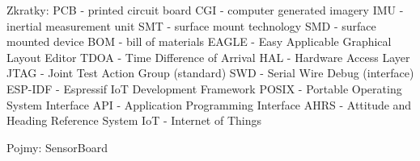 Zkratky:
PCB - printed circuit board
CGI - computer generated imagery
IMU - inertial measurement unit
SMT - surface mount technology
SMD - surface mounted device
BOM - bill of materials
EAGLE - Easy Applicable Graphical Layout Editor
TDOA - Time Difference of Arrival
HAL - Hardware Access Layer
JTAG - Joint Test Action Group (standard)
SWD - Serial Wire Debug (interface)
ESP-IDF - Espressif IoT Development Framework
POSIX - Portable Operating System Interface
API - Application Programming Interface
AHRS - Attitude and Heading Reference System
IoT - Internet of Things

Pojmy:
SensorBoard